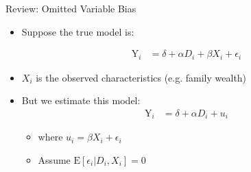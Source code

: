 \documentclass[dvipsnames,hyperref={pdfpagelabels=false}]{beamer}
\begin{document}
\begin{frame}{Review: Omitted Variable Bias}

\begin{itemize}
\item Suppose the true model is:

\begin{align*}
	\mathrm{Y}_i &= \delta + \alpha D_i + \beta X_{i} + \epsilon_{i}
	\end{align*}

\vspace{0.3cm}
\item $X_{i}$ is the observed characteristics (e.g. family wealth)
\vspace{0.3cm}
\item But we estimate this model:
\begin{align*}
	\mathrm{Y}_i &= \delta + \alpha D_i + u_i	
	\end{align*}
	
\begin{itemize}	
\item where $u_i = \beta X_{i} + \epsilon_{i}$
\vspace{0.3cm}
\item Assume $\mathrm{E}[\epsilon_{i}|D_i,X_{i}] = 0$
\end{itemize}	
\end{itemize}

\end{frame}
\end{document}
